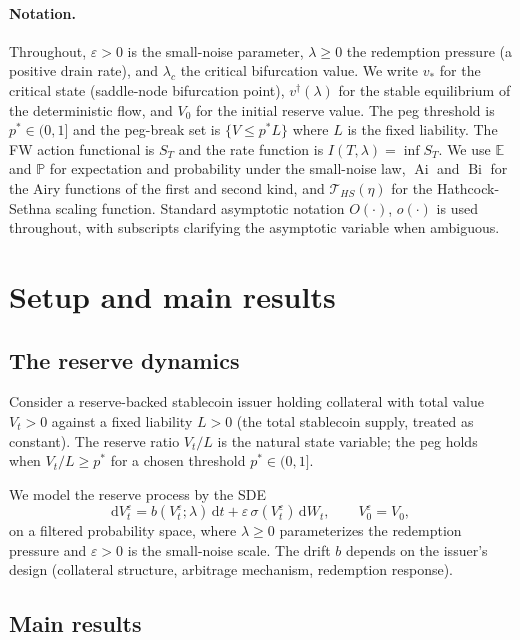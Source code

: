 \documentclass[11pt,a4paper]{article}
\theoremstyle{plain}
\theoremstyle{definition}
\renewcommand{\P}{\mathbb{P}}
\newcommand{\eps}{\varepsilon}
\renewcommand{\d}{\mathrm{d}}
\newcommand{\Ai}{\operatorname{Ai}}
\newcommand{\Bi}{\operatorname{Bi}}
\begin{document}
\paragraph{Notation.} Throughout, $\varepsilon > 0$ is the small-noise parameter, $\lambda \geq 0$ the redemption pressure (a positive drain rate), and $\lambda_c$ the critical bifurcation value. We write $v_*$ for the critical state (saddle-node bifurcation point), $v^\dagger(\lambda)$ for the stable equilibrium of the deterministic flow, and $V_0$ for the initial reserve value. The peg threshold is $p^* \in (0,1]$ and the peg-break set is $\{V \leq p^*L\}$ where $L$ is the fixed liability. The FW action functional is $S_T$ and the rate function is $I(T,\lambda) = \inf S_T$. We use $\mathbb{E}$ and $\P$ for expectation and probability under the small-noise law, $\Ai$ and $\Bi$ for the Airy functions of the first and second kind, and $\mathcal T_{HS}(\eta)$ for the Hathcock-Sethna scaling function. Standard asymptotic notation $O(\cdot)$, $o(\cdot)$ is used throughout, with subscripts clarifying the asymptotic variable when ambiguous.

\section{Setup and main results}
\label{sec:setup}

\subsection{The reserve dynamics}

Consider a reserve-backed stablecoin issuer holding collateral with total value $V_t > 0$ against a fixed liability $L > 0$ (the total stablecoin supply, treated as constant).
The reserve ratio $V_t/L$ is the natural state variable; the peg holds when $V_t/L \geq p^*$ for a chosen threshold $p^* \in (0, 1]$.

We model the reserve process by the SDE
\begin{equation}
\d V_t^\eps = b(V_t^\eps; \lambda)\,\d t + \eps\,\sigma(V_t^\eps)\,\d W_t,\qquad V_0^\eps = V_0,
\label{eq:sde}
\end{equation}
on a filtered probability space, where $\lambda \geq 0$ parameterizes the redemption pressure and $\eps > 0$ is the small-noise scale.
The drift $b$ depends on the issuer's design (collateral structure, arbitrage mechanism, redemption response).

\subsection{Main results}
\end{document}
